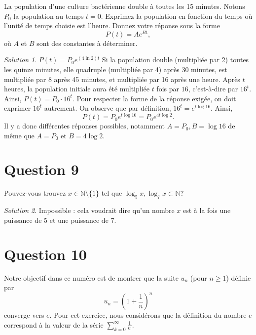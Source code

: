 \documentclass[
  12pt,
  letterpaper,
]{book}
\theoremstyle{remark}
\newtheorem*{solution}{Solution}
\begin{document}
La population d'une culture bactérienne double à toutes les 15 minutes.
Notons \(P_0\) la population au temps \(t=0\). Exprimez la population en
fonction du temps où l'unité de temps choisie est l'heure. Donnez votre
réponse sous la forme \[P(t)=Ae^{Bt},\] où \(A\) et \(B\) sont des
constantes à déterminer.

\begin{solution}

\(P(t)=P_0e^{(4\ln 2)t}\) Si la population double (multipliée par 2)
toutes les quinze minutes, elle quadruple (multipliée par 4) après 30
minutes, est multipliée par \(8\) après 45 minutes, et multipliée par 16
après une heure. Après \(t\) heures, la population initiale aura été
multipliée \(t\) fois par \(16\), c'est-à-dire par \(16^t\). Ainsi,
\(P(t)=P_0\cdot 16^{t}\). Pour respecter la forme de la réponse exigée,
on doit exprimer \(16^{t}\) autrement. On observe que par définition,
\(16^{t}=e^{t\log 16}\). Ainsi,
\[P(t)=P_0e^{t\log 16}=P_0e^{4t\log 2}.\] Il y a donc différentes
réponses possibles, notamment \(A=P_0, B=\log 16\) de même que \(A=P_0\)
et \(B=4\log 2\).

\end{solution}

\hypertarget{question-9}{%
\section{Question 9}\label{question-9}}

Pouvez-vous trouvez \(x\in\mathbb{N}\setminus\{1\}\) tel que
\({\log_5 x,\log_7 x}\subset\mathbb{N}\)?

\begin{solution}

Impossible : cela voudrait dire qu'un nombre \(x\) est à la fois une
puissance de \(5\) et une puissance de \(7\).

\end{solution}

\hypertarget{question-10}{%
\section{Question 10}\label{question-10}}

Notre objectif dans ce numéro est de montrer que la suite \(u_n\) (pour
\(n\geq 1\)) définie par \[u_n=\left(1+\frac{1}{n}\right)^n\] converge
vers \(e\). Pour cet exercice, nous considérons que la définition du
nombre \(e\) correspond à la valeur de la série
\(\sum_{k=0}^{\infty}\frac{1}{k!}.\)
\end{document}
